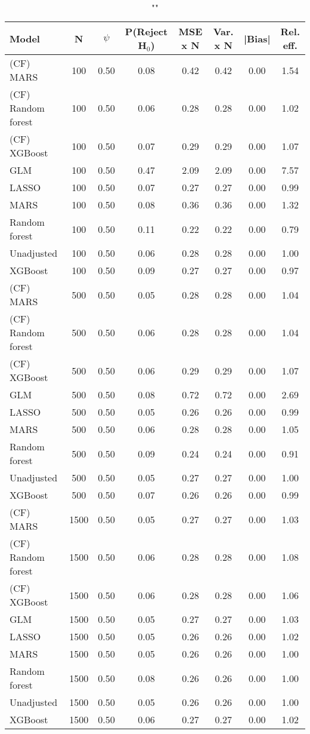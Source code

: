 \begin{table}
\centering
\caption{""}
\begin{tabular}{lccccccc}
\toprule
Model & N & $\psi$ & P(Reject H$_0$) & MSE x N & Var. x N & |Bias| & Rel. eff.\\ \midrule
(CF) MARS & 100 & 0.50 & 0.08 & 0.42 & 0.42 & 0.00 & 1.54 \\ 
(CF) Random forest & 100 & 0.50 & 0.06 & 0.28 & 0.28 & 0.00 & 1.02 \\ 
(CF) XGBoost & 100 & 0.50 & 0.07 & 0.29 & 0.29 & 0.00 & 1.07 \\ 
GLM & 100 & 0.50 & 0.47 & 2.09 & 2.09 & 0.00 & 7.57 \\ 
LASSO & 100 & 0.50 & 0.07 & 0.27 & 0.27 & 0.00 & 0.99 \\ 
MARS & 100 & 0.50 & 0.08 & 0.36 & 0.36 & 0.00 & 1.32 \\ 
Random forest & 100 & 0.50 & 0.11 & 0.22 & 0.22 & 0.00 & 0.79 \\ 
Unadjusted & 100 & 0.50 & 0.06 & 0.28 & 0.28 & 0.00 & 1.00 \\ 
XGBoost & 100 & 0.50 & 0.09 & 0.27 & 0.27 & 0.00 & 0.97 \\ \addlinespace 
(CF) MARS & 500 & 0.50 & 0.05 & 0.28 & 0.28 & 0.00 & 1.04 \\ 
(CF) Random forest & 500 & 0.50 & 0.06 & 0.28 & 0.28 & 0.00 & 1.04 \\ 
(CF) XGBoost & 500 & 0.50 & 0.06 & 0.29 & 0.29 & 0.00 & 1.07 \\ 
GLM & 500 & 0.50 & 0.08 & 0.72 & 0.72 & 0.00 & 2.69 \\ 
LASSO & 500 & 0.50 & 0.05 & 0.26 & 0.26 & 0.00 & 0.99 \\ 
MARS & 500 & 0.50 & 0.06 & 0.28 & 0.28 & 0.00 & 1.05 \\ 
Random forest & 500 & 0.50 & 0.09 & 0.24 & 0.24 & 0.00 & 0.91 \\ 
Unadjusted & 500 & 0.50 & 0.05 & 0.27 & 0.27 & 0.00 & 1.00 \\ 
XGBoost & 500 & 0.50 & 0.07 & 0.26 & 0.26 & 0.00 & 0.99 \\ \addlinespace 
(CF) MARS & 1500 & 0.50 & 0.05 & 0.27 & 0.27 & 0.00 & 1.03 \\ 
(CF) Random forest & 1500 & 0.50 & 0.06 & 0.28 & 0.28 & 0.00 & 1.08 \\ 
(CF) XGBoost & 1500 & 0.50 & 0.06 & 0.28 & 0.28 & 0.00 & 1.06 \\ 
GLM & 1500 & 0.50 & 0.05 & 0.27 & 0.27 & 0.00 & 1.03 \\ 
LASSO & 1500 & 0.50 & 0.05 & 0.26 & 0.26 & 0.00 & 1.02 \\ 
MARS & 1500 & 0.50 & 0.05 & 0.26 & 0.26 & 0.00 & 1.00 \\ 
Random forest & 1500 & 0.50 & 0.08 & 0.26 & 0.26 & 0.00 & 1.00 \\ 
Unadjusted & 1500 & 0.50 & 0.05 & 0.26 & 0.26 & 0.00 & 1.00 \\ 
XGBoost & 1500 & 0.50 & 0.06 & 0.27 & 0.27 & 0.00 & 1.02 \\
\bottomrule
\end{tabular}
\end{table}

